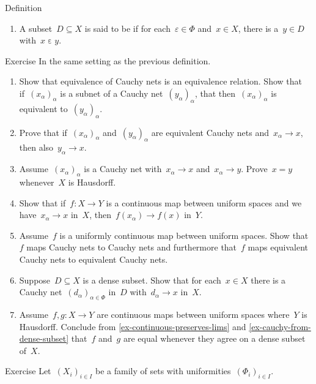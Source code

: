 \documentclass[b]{subfiles}
\begin{document}
\begin{parsec}
\begin{point}{Definition}
\begin{enumerate}
\item
    A subset~$D \subseteq X$ is said to be 
    if for each~$\varepsilon \in \Phi$ and~$x \in X$,
    there is a~$y \in D$
    with~$x \mathrel\varepsilon y$.
\end{enumerate}
\end{point}
\begin{point}{Exercise}%
    In the same setting as the previous definition.
    \begin{enumerate}
\item
    Show that equivalence of Cauchy nets is an equivalence relation.
    Show that if~$(x_\alpha)_\alpha$ is a subnet of
    a Cauchy net~$(y_\alpha)_\alpha$,
        that then~$(x_\alpha)_\alpha$ is equivalent to~$(y_\alpha)_\alpha$.
\item
    Prove that if~$(x_\alpha)_\alpha$ and~$(y_\alpha)_\alpha$
        are equivalent Cauchy nets and~$x_\alpha \to x$,
        then also~$y_\alpha \to x$.
\item
    Assume~$(x_\alpha)_\alpha$ is a Cauchy net with~$x_\alpha \to x$
        and~$x_\alpha \to y$.  Prove~$x = y$ whenever~$X$ is Hausdorff.
\item\label{ex-continuous-preserves-lims}
    Show that if~$f\colon X \to Y$ is a continuous map
    between uniform spaces
        and we have~$x_\alpha \to x$ in~$X$,
        then~$f(x_\alpha) \to f(x)$ in~$Y$.
\item
    Assume~$f$ is a uniformly continuous map between uniform spaces.
    Show that $f$ maps Cauchy nets to Cauchy nets
    and furthermore that~$f$ maps equivalent Cauchy nets to equivalent
        Cauchy nets.
\item\label{ex-cauchy-from-dense-subset}
    Suppose~$D \subseteq X$ is a dense subset.
    Show that for each~$x \in X$
    there is a Cauchy net~$(d_\alpha)_{\alpha \in \Phi}$
    in~$D$ with~$d_\alpha \to x$ in~$X$.
\item
    Assume~$f,g\colon X \to Y$ are continuous maps between uniform spaces
        where~$Y$ is Hausdorff.
Conclude from \ref{ex-continuous-preserves-lims} and
    \ref{ex-cauchy-from-dense-subset}
    that~$f$ and~$g$ are equal whenever they agree on a dense subset of~$X$.
    \end{enumerate}
\end{point}
\begin{point}{Exercise}%
    Let~$(X_i)_{i \in I}$ be a family of sets with
        uniformities~$(\Phi_i)_{i \in I}$.

\end{point}
\end{parsec}
\end{document}
